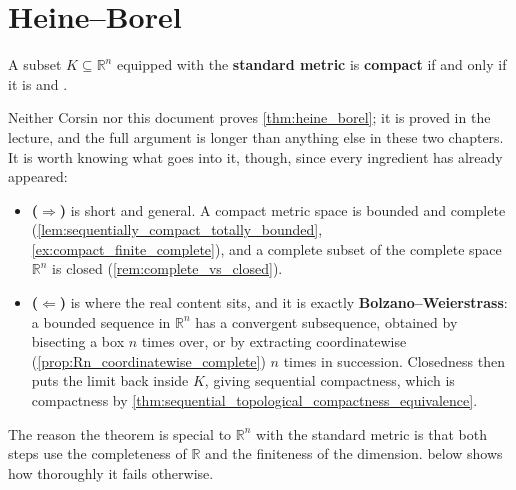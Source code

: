 
\section{Heine--Borel}
\label{sec:heine_borel}

\begin{theorem}
\label{thm:heine_borel}
A subset $K \subseteq \mathbb{R}^n$ equipped with the \textbf{standard metric} is
\textbf{compact} if and only if it is  and 
.
\end{theorem}

\begin{ainote}
Neither Corsin nor this document proves \cref{thm:heine_borel}; it is proved in the lecture, and
the full argument is longer than anything else in these two chapters. It is worth knowing what
goes into it, though, since every ingredient has already appeared:
\begin{itemize}
  \item \textbf{($\Rightarrow$)} is short and general. A compact metric space is bounded and
    complete (\cref{lem:sequentially_compact_totally_bounded},
    \cref{ex:compact_finite_complete}), and a complete subset of the complete space
    $\mathbb{R}^n$ is closed (\cref{rem:complete_vs_closed}).
  \item \textbf{($\Leftarrow$)} is where the real content sits, and it is exactly
    \textbf{Bolzano--Weierstrass}: a bounded sequence in $\mathbb{R}^n$ has a convergent
    subsequence, obtained by bisecting a box $n$ times over, or by extracting coordinatewise
    (\cref{prop:Rn_coordinatewise_complete}) $n$ times in succession. Closedness then puts the
    limit back inside $K$, giving sequential compactness, which is compactness by
    \cref{thm:sequential_topological_compactness_equivalence}.
\end{itemize}
The reason the theorem is special to $\mathbb{R}^n$ with the standard metric is that both steps
use the completeness of $\mathbb{R}$ and the finiteness of the dimension.
 below shows how thoroughly it fails otherwise.
\end{ainote}

